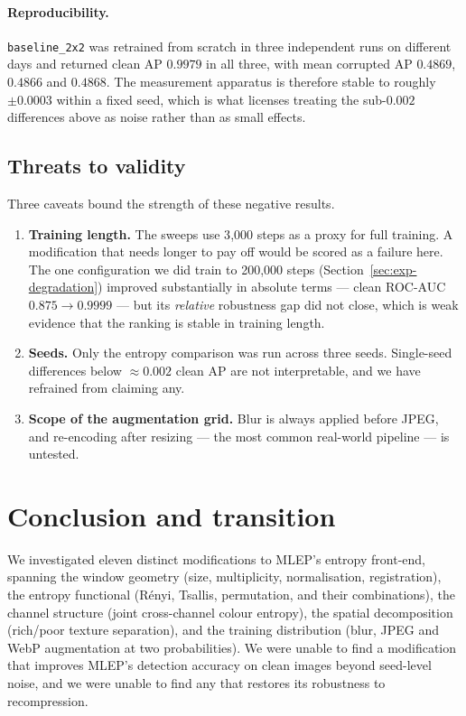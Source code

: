 \paragraph{Reproducibility.} \texttt{baseline\_2x2} was retrained from scratch in
three independent runs on different days and returned clean AP $0.9979$ in all
three, with mean corrupted AP $0.4869$, $0.4866$ and $0.4868$. The measurement
apparatus is therefore stable to roughly $\pm0.0003$ within a fixed seed, which
is what licenses treating the sub-$0.002$ differences above as noise rather than
as small effects.

\subsection{Threats to validity}

Three caveats bound the strength of these negative results.

\begin{enumerate}
  \item \textbf{Training length.} The sweeps use 3{,}000 steps as a proxy for
    full training. A modification that needs longer to pay off would be scored as
    a failure here. The one configuration we did train to 200{,}000 steps
    (Section~\ref{sec:exp-degradation}) improved substantially in absolute terms
    --- clean ROC-AUC $0.875 \to 0.9999$ --- but its \emph{relative} robustness
    gap did not close, which is weak evidence that the ranking is stable in
    training length.
  \item \textbf{Seeds.} Only the entropy comparison was run across three seeds.
    Single-seed differences below $\approx0.002$ clean AP are not interpretable,
    and we have refrained from claiming any.
  \item \textbf{Scope of the augmentation grid.} Blur is always applied before
    JPEG, and re-encoding after resizing --- the most common real-world
    pipeline --- is untested.
\end{enumerate}

\section{Conclusion and transition}
\label{sec:conclusion}

We investigated eleven distinct modifications to MLEP's entropy front-end,
spanning the window geometry (size, multiplicity, normalisation, registration),
the entropy functional (Rényi, Tsallis, permutation, and their combinations),
the channel structure (joint cross-channel colour entropy), the spatial
decomposition (rich/poor texture separation), and the training distribution
(blur, JPEG and WebP augmentation at two probabilities). We were unable to find
a modification that improves MLEP's detection accuracy on clean images beyond
seed-level noise, and we were unable to find any that restores its robustness to
recompression.

